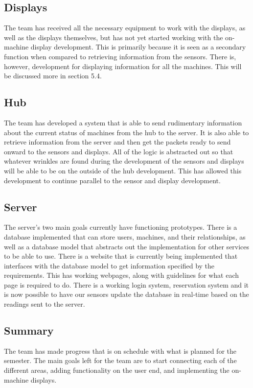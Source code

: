 \documentclass[letterpaper,11pt]{./templates/texMemo} %
\begin{document}
\subsection{Displays}
The team has received all the necessary equipment to work with the displays, as well as the displays themselves, but has not yet started working with the on-machine display development. This is primarily because it is seen as a secondary function when compared to retrieving information from the sensors. There is, however, development for displaying information for all the machines. This will be discussed more in section 5.4.

\subsection{Hub}
The team has developed a system that is able to send rudimentary information about the current status of machines from the hub to the server. It is also able to retrieve information from the server and then get the packets ready to send onward to the sensors and displays. All of the logic is abstracted out so that whatever wrinkles are found during the development of the sensors and displays will be able to be on the outside of the hub development. This has allowed this development to continue parallel to the sensor and display development.

\subsection{Server}
The server's two main goals currently have functioning prototypes. There is a database implemented that can store users, machines, and their relationships, as well as a database model that abstracts out the implementation for other services to be able to use. There is a website that is currently being implemented that interfaces with the database model to get information specified by the requirements. This has working webpages, along with guidelines for what each page is required to do. There is a working login system, reservation system and it is now possible to have our sensors update the database in real-time based on the readings sent to the server.

\subsection{Summary}
The team has made progress that is on schedule with what is planned for the semester. The main goals left for the team are to start connecting each of the different areas, adding functionality on the user end, and implementing the on-machine displays.
\end{document}
